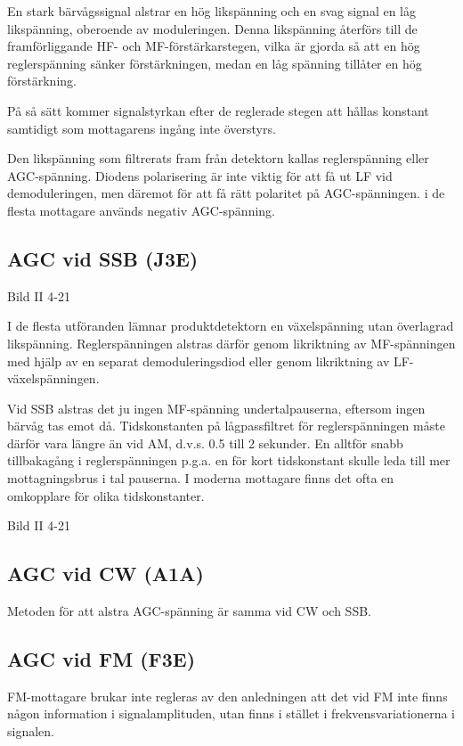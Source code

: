 En stark bärvågssignal alstrar en hög likspänning och en svag signal
en låg likspänning, oberoende av moduleringen.  Denna likspänning
återförs till de framförliggande HF- och MF-förstärkarstegen, vilka är
gjorda så att en hög reglerspänning sänker förstärkningen, medan en
låg spänning tillåter en hög förstärkning.

På så sätt kommer signalstyrkan efter de reglerade stegen att hållas
konstant samtidigt som mottagarens ingång inte överstyrs.

Den likspänning som filtrerats fram från detektorn kallas
reglerspänning eller AGC-spänning. Diodens polarisering är inte viktig
för att få ut LF vid demoduleringen, men däremot för att få rätt
polaritet på AGC-spänningen. i de flesta mottagare används negativ
AGC-spänning.

\subsection{AGC vid SSB (J3E)}

Bild II 4-21

I de flesta utföranden lämnar produktdetektorn en växelspänning utan
överlagrad likspänning. Reglerspänningen alstras därför genom
likriktning av MF-spänningen med hjälp av en separat demoduleringsdiod
eller genom likriktning av LF-växelspänningen.

Vid SSB alstras det ju ingen MF-spänning undertalpauserna, eftersom
ingen bärvåg tas emot då. Tidskonstanten på lågpassfiltret för
reglerspänningen måste därför vara längre än vid AM, d.v.s. 0.5 till 2
sekunder. En alltför snabb tillbakagång i reglerspänningen p.g.a. en
för kort tidskonstant skulle leda till mer mottagningsbrus i tal
pauserna. I moderna mottagare finns det ofta en omkopplare för olika
tidskonstanter.

Bild II 4-21

\subsection{AGC vid CW (A1A)}

Metoden för att alstra AGC-spänning är samma vid CW och SSB.

\subsection{AGC vid FM (F3E)}

FM-mottagare brukar inte regleras av den anledningen att det vid FM
inte finns någon information i signalamplituden, utan finns i stället
i frekvensvariationerna i signalen.


